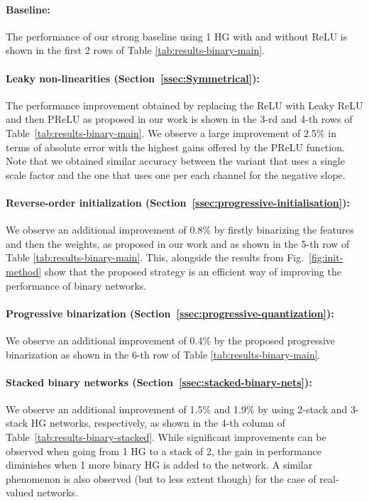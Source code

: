 \documentclass[10pt,twocolumn,letterpaper]{article}
\begin{document}
\paragraph{Baseline:} The performance of our strong baseline \cite{bulat2017binarized} using 1 HG with and without ReLU is shown in the first 2 rows of Table \ref{tab:results-binary-main}.\paragraph{Leaky non-linearities (Section~\ref{ssec:Symmetrical}):} The performance improvement obtained by replacing the ReLU with Leaky ReLU and then PReLU as proposed in our work is shown in the 3-rd and 4-th rows of Table~\ref{tab:results-binary-main}. We observe a large improvement of 2.5\% in terms of absolute error with the highest gains offered by the PReLU function. Note that we obtained similar accuracy between the variant that uses a single scale factor and the one that uses one per each channel for the negative slope. \paragraph{Reverse-order initialization (Section~\ref{ssec:progressive-initialisation}):} We observe an additional improvement of 0.8\% by firstly binarizing the features and then the weights, as proposed in our work and as shown in the 5-th row of Table \ref{tab:results-binary-main}. This, alongside the results from Fig.~\ref{fig:init-method} show that the proposed strategy is an efficient way of improving the performance of binary networks. \paragraph{Progressive binarization (Section~\ref{ssec:progressive-quantization}):} We observe an additional improvement of 0.4\% by the proposed progressive binarization as shown in the 6-th row of Table \ref{tab:results-binary-main}.\paragraph{Stacked binary networks (Section~\ref{ssec:stacked-binary-nets}):} We observe an additional improvement of 1.5\% and 1.9\% by using 2-stack and 3-stack HG networks, respectively, as shown in the 4-th column of Table~\ref{tab:results-binary-stacked}. While significant improvements can be observed when going from 1 HG to a stack of 2, the gain in performance diminishes when 1 more binary HG is added to the network. A similar phenomenon is also observed (but to less extent though) for the case of real-valued networks.
\end{document}
